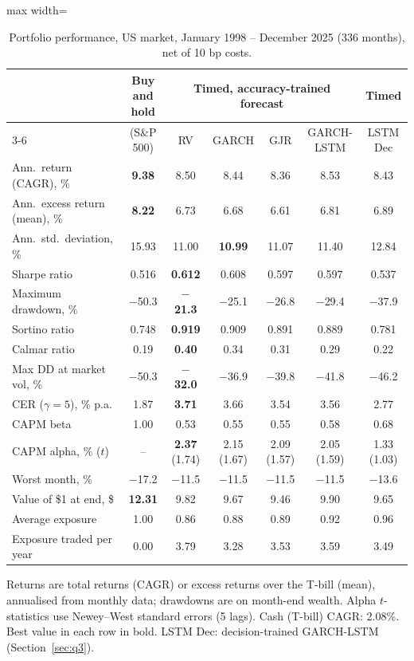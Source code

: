 \begin{table}[htbp]
\centering\small
\caption{Portfolio performance, US market, January 1998 -- December 2025 (336 months), net of 10 bp costs.}\label{tab:perf}
\begin{adjustbox}{max width=\linewidth}\begin{tabular}{@{}lcccccc@{}}
\toprule
 & Buy and hold & \multicolumn{4}{c}{Timed, accuracy-trained forecast} & Timed\\
\cmidrule(lr){3-6}
 & (S\&P 500) & RV & GARCH & GJR & GARCH-LSTM & LSTM Dec\\
\midrule
Ann.\ return (CAGR), \% & \textbf{9.38} & 8.50 & 8.44 & 8.36 & 8.53 & 8.43\\
Ann.\ excess return (mean), \% & \textbf{8.22} & 6.73 & 6.68 & 6.61 & 6.81 & 6.89\\
Ann.\ std.\ deviation, \% & 15.93 & 11.00 & \textbf{10.99} & 11.07 & 11.40 & 12.84\\
Sharpe ratio & 0.516 & \textbf{0.612} & 0.608 & 0.597 & 0.597 & 0.537\\
Maximum drawdown, \% & $-$50.3 & \textbf{$-$21.3} & $-$25.1 & $-$26.8 & $-$29.4 & $-$37.9\\
Sortino ratio & 0.748 & \textbf{0.919} & 0.909 & 0.891 & 0.889 & 0.781\\
Calmar ratio & 0.19 & \textbf{0.40} & 0.34 & 0.31 & 0.29 & 0.22\\
Max DD at market vol, \% & $-$50.3 & \textbf{$-$32.0} & $-$36.9 & $-$39.8 & $-$41.8 & $-$46.2\\
CER ($\gamma=5$), \% p.a. & 1.87 & \textbf{3.71} & 3.66 & 3.54 & 3.56 & 2.77\\
CAPM beta & 1.00 & 0.53 & 0.55 & 0.55 & 0.58 & 0.68\\
CAPM alpha, \% ($t$) & -- & \textbf{2.37} (1.74) & 2.15 (1.67) & 2.09 (1.57) & 2.05 (1.59) & 1.33 (1.03)\\
Worst month, \% & $-$17.2 & $-$11.5 & $-$11.5 & $-$11.5 & $-$11.5 & $-$13.6\\
Value of \$1 at end, \$ & \textbf{12.31} & 9.82 & 9.67 & 9.46 & 9.90 & 9.65\\
Average exposure & 1.00 & 0.86 & 0.88 & 0.89 & 0.92 & 0.96\\
Exposure traded per year & 0.00 & 3.79 & 3.28 & 3.53 & 3.59 & 3.49\\
\bottomrule
\end{tabular}\end{adjustbox}
\par\smallskip\parbox{\textwidth}{\footnotesize Returns are total returns (CAGR) or excess returns over the T-bill (mean), annualised from monthly data; drawdowns are on month-end wealth. Alpha $t$-statistics use Newey--West standard errors (5 lags). Cash (T-bill) CAGR: 2.08\%. Best value in each row in bold. LSTM Dec: decision-trained GARCH-LSTM (Section~\ref{sec:q3}).}
\end{table}

